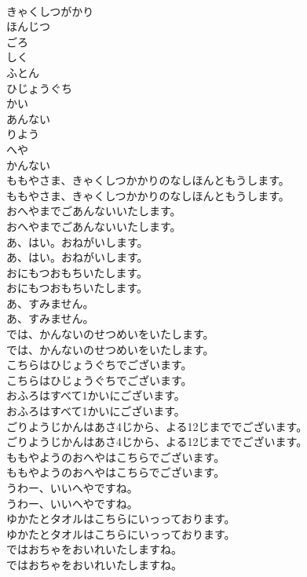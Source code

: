 \documentclass[8pt]{extreport}
\begin{document}
\begin{CJK}{UTF8}{min}
\\	きゃくしつがかり
\\	ほんじつ
\\	ごろ
\\	しく
\\	ふとん
\\	ひじょうぐち
\\	かい
\\	あんない
\\	りよう
\\	へや
\\	かんない
\\	ももやさま、きゃくしつかかりのなしほんともうします。	
\\	ももやさま、きゃくしつかかりのなしほんともうします。 
\\	おへやまでごあんないいたします。	
\\	おへやまでごあんないいたします。 
\\	あ、はい。おねがいします。	
\\	あ、はい。おねがいします。 
\\	おにもつおもちいたします。	
\\	おにもつおもちいたします。 
\\	あ、すみません。	
\\	あ、すみません。 
\\	では、かんないのせつめいをいたします。	
\\	では、かんないのせつめいをいたします。 
\\	こちらはひじょうぐちでございます。	
\\	こちらはひじょうぐちでございます。 
\\	おふろはすべて1かいにございます。	
\\	おふろはすべて1かいにございます。 
\\	ごりようじかんはあさ4じから、よる12じまででございます。	
\\	ごりようじかんはあさ4じから、よる12じまででございます。 
\\	ももやようのおへやはこちらでございます。	
\\	ももやようのおへやはこちらでございます。 
\\	うわー、いいへやですね。	
\\	うわー、いいへやですね。 
\\	ゆかたとタオルはこちらにいっっております。	
\\	ゆかたとタオルはこちらにいっっております。 
\\	ではおちゃをおいれいたしますね。	
\\	ではおちゃをおいれいたしますね。 

\end{CJK}
\end{document}
